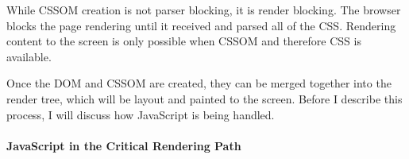 




While CSSOM creation is not parser blocking, it is render blocking.
The browser blocks the page rendering until it received and parsed all of the CSS.
Rendering content to the screen is only possible when CSSOM and therefore CSS is available. %



Once the DOM and CSSOM are created, they can be merged together into the render tree, which will be layout and painted to the screen.
Before I describe this process, I will discuss how JavaScript is being handled.















\paragraph{JavaScript in the Critical Rendering Path}


